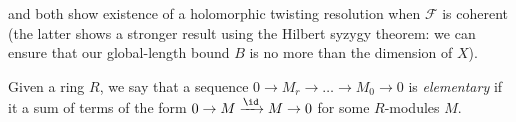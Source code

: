         \begin{note}
             \Cite[Lemma~8.13]{Toledo:1976gy} and \cite[Lemma~2.4]{Toledo:1978tq} both show existence of a holomorphic twisting resolution when $\mathcal{F}$ is coherent (the latter shows a stronger result using the Hilbert syzygy theorem: we can ensure that our global-length bound $B$ is no more than the dimension of $X$).
        \end{note}

        \begin{definition}
            Given a ring $R$, we say that a sequence $0\to M_r\to\ldots\to M_0\to0$ is \emph{elementary} if it a sum of terms of the form $0\to M\xrightarrow{\id}M\to 0$ for some $R$-modules $M$.
        \end{definition}

